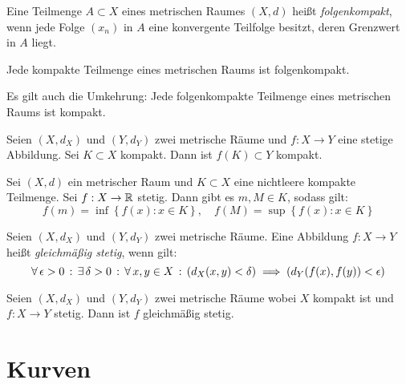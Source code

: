 \documentclass{cheat-sheet}
\begin{document}
\begin{defn}
Eine Teilmenge $A \subset X$ eines metrischen Raumes $(X, d)$ heißt \emph{folgenkompakt}, wenn jede Folge $(x_n)$ in $A$ eine konvergente Teilfolge besitzt, deren Grenzwert in $A$ liegt.
\end{defn}

\begin{satz}
Jede kompakte Teilmenge eines metrischen Raums ist folgenkompakt.
\end{satz}

\begin{bem}
Es gilt auch die Umkehrung: Jede folgenkompakte Teilmenge eines metrischen Raums ist kompakt.
\end{bem}

\begin{satz}
Seien $(X, d_X)$ und $(Y, d_Y)$ zwei metrische Räume und $f : X \to Y$ eine stetige Abbildung. Sei $K \subset X$ kompakt. Dann ist $f(K) \subset Y$ kompakt.
\end{satz}

\begin{satz}
Sei $(X, d)$ ein metrischer Raum und $K \subset X$ eine nichtleere kompakte Teilmenge. Sei $f : X \to \mathbb{R}$ stetig. Dann gibt es $m, M \in K$, sodass gilt:
\[ f(m) = \inf\left\{ f(x) : x \in K \right\},\quad f(M) = \sup\left\{ f(x) : x \in K \right\} \]
\end{satz}

\begin{defn}
Seien $(X, d_X)$ und $(Y, d_Y)$ zwei metrische Räume. Eine Abbildung $f : X \to Y$ heißt \emph{gleichmäßig stetig}, wenn gilt:
\[ \forall \, {\epsilon > 0} \,:\, \exists \, {\delta > 0} \,:\, \forall \, {x, y \in X} \,:\, \left(d_X(x, y) < \delta\right) \implies \left( d_Y(f(x), f(y)) < \epsilon \right) \]
\end{defn}

\begin{samepage} %

\begin{satz}
Seien $(X, d_X)$ und $(Y, d_Y)$ zwei metrische Räume wobei $X$ kompakt ist und $f : X \to Y$ stetig. Dann ist $f$ gleichmäßig stetig.
\end{satz}

\section{Kurven}

\end{samepage}
\end{document}
